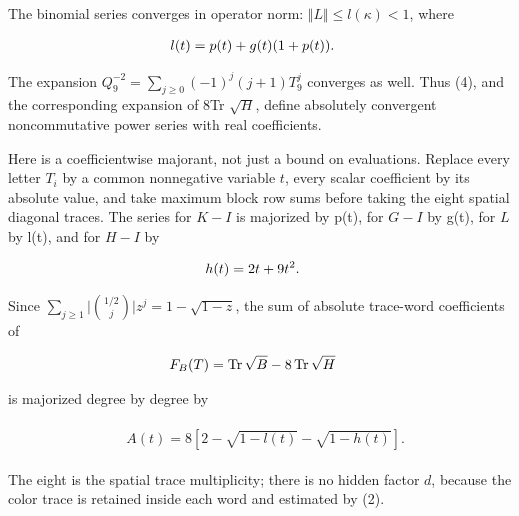 The binomial series converges in operator norm:
\(\Vert L\Vert \le l( \kappa  )<1\), where

\begin{gather*}
\begin{aligned}
& l(t)=p(t)+g(t)(1+p(t)).
\end{aligned}\notag
\end{gather*}

The expansion \(Q_{9}^{-2}=\sum _{j\ge 0}(-1)^{j}(j+1)T_{9}^{j}\)
converges as well. Thus (4), and the corresponding expansion of 8Tr
\(\sqrt{H}\), define absolutely convergent noncommutative power series
with real coefficients.

Here is a coefficientwise majorant, not just a bound on evaluations.
Replace every letter \(T_{i}\) by a common nonnegative variable \(t\),
every scalar coefficient by its absolute value, and take maximum block
row sums before taking the eight spatial diagonal traces. The series for
\(K-I\) is majorized by p(t), for \(G-I\) by g(t), for \(L\) by l(t),
and for \(H-I\) by

\begin{gather*}
\begin{aligned}
& h(t)=2t+9t^{2}.
\end{aligned}\notag
\end{gather*}

Since \(\sum _{j\ge 1}\vert \binom{1/2}{j}\vert z^{j}=1-\sqrt{1-z}\),
the sum of absolute trace-word coefficients of

\begin{gather*}
\begin{aligned}
& F_{B}(T)=\operatorname{Tr}  \sqrt{B}-8\operatorname{Tr}  \sqrt{H}
\end{aligned}\notag
\end{gather*}

is majorized degree by degree by

\begin{gather*}
\begin{aligned}
& A(t)=8[2-\sqrt{1-l(t)}-\sqrt{1-h(t)}].
\end{aligned}\tag{5}
\end{gather*}

The eight is the spatial trace multiplicity; there is no hidden factor
\(d\), because the color trace is retained inside each word and
estimated by (2).

